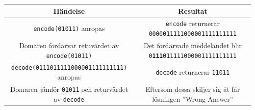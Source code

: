 \begin{table}[htbp]
  \centering
  \begin{tabular}{|c|c|}
      \hline
      \textbf{Händelse} & \textbf{Resultat} \\
      \hline
      \texttt{encode(01011)} anropas & \texttt{encode} returnerar \texttt{0000011111000001111111111} \\
      \hline
      Domaren fördärvar retuvärdet av \texttt{encode(01011)} & Det fördärvade meddelandet blir
      \texttt{0\textbf{111}011111000001111111111} \\
      \hline
      \texttt{decode(0111011111000001111111111)} anropas & \texttt{decode} returnerar \texttt{11011} \\
      \hline
      Domaren jämför \texttt{01011} och returvärdet av \texttt{decode} & Eftersom dessa skiljer sig åt får lösningen
      ''Wrong Answer'' \\
      \hline 
  \end{tabular}
\end{table}
